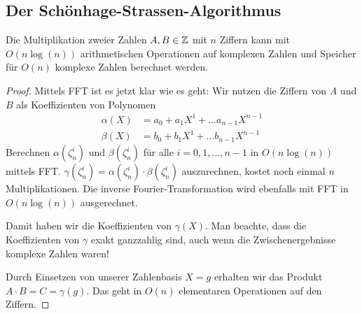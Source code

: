 
\subsection{Der Schönhage-Strassen-Algorithmus}\label{schoenhage-strassen}

\begin{corollary}
    Die Multiplikation zweier Zahlen $A,B\in\mathbb{Z}$ mit $n$ Ziffern kann mit $O(n\log(n))$ arithmetischen Operationen auf komplexen Zahlen und Speicher für $O(n)$ komplexe Zahlen berechnet werden.
\end{corollary}
\begin{proof}
    Mittels FFT ist es jetzt klar wie es geht: Wir nutzen die Ziffern von $A$ und $B$ als Koeffizienten von Polynomen
    \begin{align*}
        \alpha(X) &= a_0 + a_1 X^1 + \ldots a_{n-1} X^{n-1}\\
        \beta(X)  &= b_0 + b_1 X^1 + \ldots b_{n-1} X^{n-1}
    \end{align*}
    Berechnen $\alpha(\zeta_n^i)$ und $\beta(\zeta_n^i)$ für alle $i=0,1,\ldots,n-1$ in $O(n\log(n))$ mittels FFT. $\gamma(\zeta_n^i) = \alpha(\zeta_n^i)\cdot\beta(\zeta_n^i)$ auszurechnen, kostet noch einmal $n$ Multiplikationen. Die inverse Fourier-Transformation wird ebenfalls mit FFT in $O(n\log(n))$ ausgerechnet.

    Damit haben wir die Koeffizienten von $\gamma(X)$. Man beachte, dass die Koeffizienten von $\gamma$ exakt ganzzahlig sind, auch wenn die Zwischenergebnisse komplexe Zahlen waren!

    Durch Einsetzen von unserer Zahlenbasis $X=g$ erhalten wir das Produkt $A\cdot B = C=\gamma(g)$. Das geht in $O(n)$ elementaren Operationen auf den Ziffern.
\end{proof}

